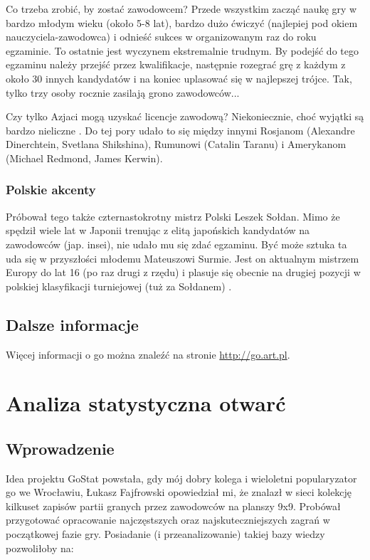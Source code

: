 \documentclass[11pt,leqno]{article}
\begin{document}
Co trzeba zrobić, by zostać zawodowcem? Przede wszystkim zacząć naukę gry w bardzo młodym wieku (około 5-8 lat), 
bardzo dużo ćwiczyć (najlepiej pod okiem nauczyciela-zawodowca) i odnieść sukces w organizowanym raz do roku egzaminie. 
To ostatnie jest wyczynem ekstremalnie trudnym. By podejść do tego egzaminu należy przejść przez kwalifikacje, następnie 
rozegrać grę z każdym z około 30 innych kandydatów i na koniec uplasować się w najlepszej trójce. 
Tak, tylko trzy osoby rocznie zasilają grono zawodowców...

Czy tylko Azjaci mogą uzyskać licencje zawodową? Niekoniecznie, choć wyjątki są bardzo nieliczne \cite{gopros}. Do tej pory udało
to się między innymi Rosjanom (Alexandre Dinerchtein, Svetlana Shikshina), Rumunowi (Catalin Taranu) i Amerykanom 
(Michael Redmond, James Kerwin).

\subsubsection{Polskie akcenty}

Próbował tego także czternastokrotny mistrz Polski Leszek Sołdan. Mimo że spędził wiele lat w Japonii 
trenując z elitą japońskich kandydatów na zawodowców (jap. insei), nie udało mu się zdać egzaminu. Być może sztuka 
ta uda się w przyszłości młodemu Mateuszowi Surmie. Jest on aktualnym mistrzem Europy do lat 16 (po raz drugi z rzędu) i plasuje się 
obecnie na drugiej pozycji w polskiej klasyfikacji turniejowej (tuż za Sołdanem) \cite{ranking}.

\subsection{Dalsze informacje}

Więcej informacji o go można znaleźć na stronie \url{http://go.art.pl}.

\section{Analiza statystyczna otwarć}

\subsection{Wprowadzenie}

Idea projektu GoStat powstała, gdy mój dobry kolega i wieloletni popularyzator go we Wrocławiu, Łukasz Fajfrowski opowiedział mi, że znalazł w sieci kolekcję 
kilkuset zapisów partii granych przez zawodowców na planszy 9x9. Probówał przygotować opracowanie najczęstszych oraz
najskuteczniejszych zagrań w początkowej fazie gry. Posiadanie (i przeanalizowanie) takiej bazy wiedzy pozwoliłoby na:
\end{document}
